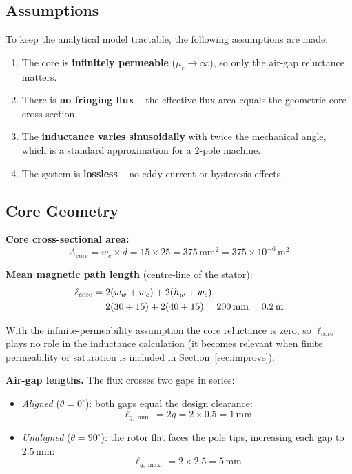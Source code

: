 \documentclass[12pt,a4paper]{article}
\newcommand{\unit}[1]{\,\mathrm{#1}}
\begin{document}
\subsection{Assumptions}

To keep the analytical model tractable, the following assumptions are made:

\begin{enumerate}[label=\alph*)]
  \item The core is \textbf{infinitely permeable} ($\mu_r \to \infty$),
        so only the air-gap reluctance matters.
  \item There is \textbf{no fringing flux} -- the effective flux area
        equals the geometric core cross-section.
  \item The \textbf{inductance varies sinusoidally} with twice the
        mechanical angle, which is a standard approximation for a 2-pole
        machine.
  \item The system is \textbf{lossless} -- no eddy-current or hysteresis
        effects.
\end{enumerate}

\subsection{Core Geometry}

\textbf{Core cross-sectional area:}
\begin{equation}
  A_{\mathrm{core}} = w_c \times d = 15 \times 25 = 375\unit{mm^2}
  = 375 \times 10^{-6}\unit{m^2}
\end{equation}

\textbf{Mean magnetic path length} (centre-line of the stator):
\begin{align}
  \ell_{\mathrm{core}}
    &= 2(w_w + w_c) + 2(h_w + w_c) \notag \\
    &= 2(30+15) + 2(40+15) = 200\unit{mm} = 0.2\unit{m}
\end{align}

With the infinite-permeability assumption the core reluctance is zero,
so $\ell_{\mathrm{core}}$ plays no role in the inductance calculation
(it becomes relevant when finite permeability or saturation is
included in Section~\ref{sec:improve}).

\textbf{Air-gap lengths.} The flux crosses two gaps in series:

\begin{itemize}
  \item \emph{Aligned} ($\theta = 0^{\circ}$): both gaps equal the
        design clearance:
        \[
          \ell_{g,\min} = 2g = 2 \times 0.5 = 1\unit{mm}
        \]
  \item \emph{Unaligned} ($\theta = 90^{\circ}$): the rotor flat
        faces the pole tips, increasing each gap to $2.5\unit{mm}$:
        \[
          \ell_{g,\max} = 2 \times 2.5 = 5\unit{mm}
        \]
\end{itemize}
\end{document}
